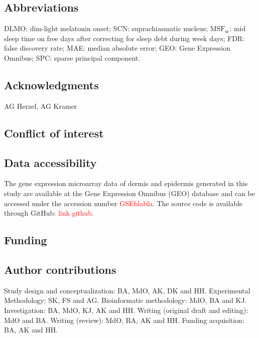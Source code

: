 \subsection*{Abbreviations}
DLMO: dim-light melatonin onset; SCN: suprachiasmatic nucleus; $\textrm{MSF}_\textrm{sc}$: mid sleep time on free days after correcting for sleep debt during week days; FDR: false discovery rate; MAE: median absolute error; GEO: Gene Expression Omnibus; SPC: sparse principal component.

\subsection*{Acknowledgments}
AG Herzel, AG Kramer 

\subsection*{Conflict of interest}


\subsection*{Data accessibility}
The gene expression microarray data of dermis and epidermis generated in this study are available at the Gene Expression Omnibus (GEO) database and can be accessed under the accession number \textcolor{red}{GSEblabla}. The source code is available through GitHub: \textcolor{red}{link github}. 

\subsection*{Funding}

\subsection*{Author contributions}
Study design and conceptualization: BA, MdO, AK, DK and HH. Experimental Methodology: SK, FS and AG. Bioinformatic methodology: MdO, BA and KJ. Investigation: BA, MdO, KJ, AK and HH. Writing (original draft and editing): MdO and BA. Writing (review): MdO, BA, AK and HH. Funding acquisition: BA, AK and HH. 


